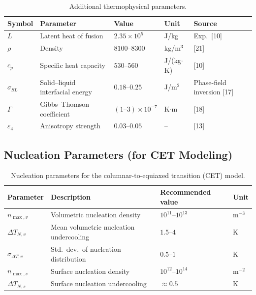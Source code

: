 \documentclass[12pt, a4paper]{article}
\begin{document}
\begin{table}[htbp]
\centering
\caption{Additional thermophysical parameters.}
\label{tab:thermo2}
\begin{tabular}{lllll}
\toprule
Symbol & Parameter & Value & Unit & Source \\
\midrule
$L$          & Latent heat of fusion           & $2.35\times10^5$          & J/kg        & Exp.\ [10] \\
$\rho$       & Density                          & $8100$--$8300$            & kg/m$^3$    & [21] \\
$c_p$        & Specific heat capacity           & $530$--$560$              & J/(kg$\cdot$K) & [10] \\
$\sigma_{SL}$& Solid--liquid interfacial energy & $0.18$--$0.25$            & J/m$^2$     & Phase-field inversion [17] \\
$\Gamma$     & Gibbs--Thomson coefficient       & $(1\text{--}3)\times10^{-7}$ & K$\cdot$m  & [18] \\
$\varepsilon_4$ & Anisotropy strength           & $0.03$--$0.05$            & --          & [13] \\
\bottomrule
\end{tabular}
\end{table}

\subsection{Nucleation Parameters (for CET Modeling)}

\begin{table}[htbp]
\centering
\caption{Nucleation parameters for the columnar-to-equiaxed transition (CET) model.}
\label{tab:nucl}
\begin{tabular}{llll}
\toprule
Parameter & Description & Recommended value & Unit \\
\midrule
$n_{\max,v}$      & Volumetric nucleation density        & $10^{11}$--$10^{13}$ & m$^{-3}$ \\
$\Delta T_{N,v}$  & Mean volumetric nucleation undercooling & $1.5$--$4$          & K \\
$\sigma_{\Delta T,v}$ & Std.\ dev.\ of nucleation distribution & $0.5$--$1$      & K \\
$n_{\max,s}$      & Surface nucleation density           & $10^{12}$--$10^{14}$ & m$^{-2}$ \\
$\Delta T_{N,s}$  & Surface nucleation undercooling      & $\approx 0.5$        & K \\
\bottomrule
\end{tabular}
\end{table}
\end{document}
